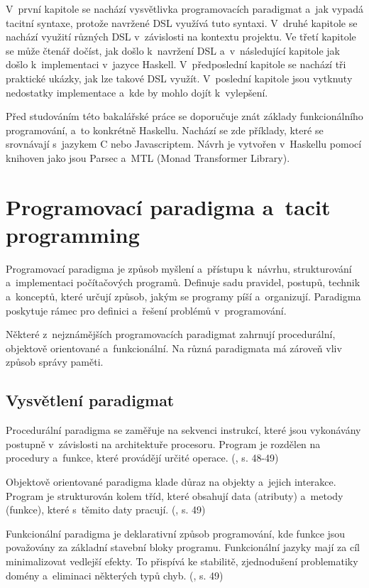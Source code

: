 \documentclass[male, czech]{kithesis}
\begin{document}
V~první kapitole se nachází vysvětlivka programovacích paradigmat
a~jak vypadá tacitní syntaxe, 
protože navržené DSL využívá tuto syntaxi. 
V~druhé kapitole se nachází využití různých DSL v~závislosti na kontextu projektu.
Ve třetí kapitole se může čtenář dočíst, 
jak došlo k~navržení DSL
a~v~následující kapitole jak došlo k~implementaci v~jazyce Haskell.
V~předposlední kapitole se nachází tři praktické ukázky, 
jak lze takové DSL využít.
V~poslední kapitole jsou vytknuty nedostatky implementace
a~kde by mohlo dojít k~vylepšení. 

Před studováním této bakalářské práce se doporučuje znát základy funkcionálního programování,
a~to konkrétně Haskellu.
Nachází se zde příklady,
které se srovnávají s~jazykem C nebo Javascriptem.
Návrh je vytvořen v~Haskellu pomocí knihoven jako
jsou Parsec a~MTL (Monad Transformer Library).

\chapter{Programovací paradigma a~tacit programming}

Programovací paradigma je způsob myšlení a~přístupu k~návrhu, 
strukturování
a~implementaci počítačových programů. 
Definuje sadu pravidel, postupů, technik a~konceptů, 
které určují způsob,
jakým se programy píší a~organizují. 
Paradigma poskytuje rámec pro definici
a~řešení problémů v~programování.

Některé z~nejznámějších programovacích paradigmat zahrnují 
procedurální, objektově orientované a~funkcionální.
Na různá paradigmata má zároveň vliv způsob 
správy paměti.

\section{Vysvětlení paradigmat}

Procedurální paradigma se zaměřuje na sekvenci instrukcí, 
které jsou vykonávány postupně
v~závislosti na architektuře procesoru.
Program je rozdělen na procedury a~funkce, 
které provádějí určité operace. (\cite{Martin2018}, s. 48-49)

Objektově orientované paradigma klade důraz na objekty
a~jejich interakce. 
Program je strukturován kolem tříd, 
které obsahují data (atributy)
a~metody (funkce), 
které s~těmito daty pracují. (\cite{Martin2018}, s. 49)

Funkcionální paradigma je deklarativní způsob programování, 
kde funkce jsou považovány za základní stavební bloky programu. 
Funkcionální jazyky mají za cíl minimalizovat vedlejší efekty.
To přispívá ke stabilitě, zjednodušení problematiky domény
a~eliminaci některých typů chyb. (\cite{Martin2018}, s. 49)
\end{document}
